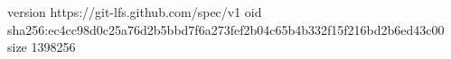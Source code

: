 version https://git-lfs.github.com/spec/v1
oid sha256:ec4cc98d0c25a76d2b5bbd7f6a273fef2b04c65b4b332f15f216bd2b6ed43c00
size 1398256
